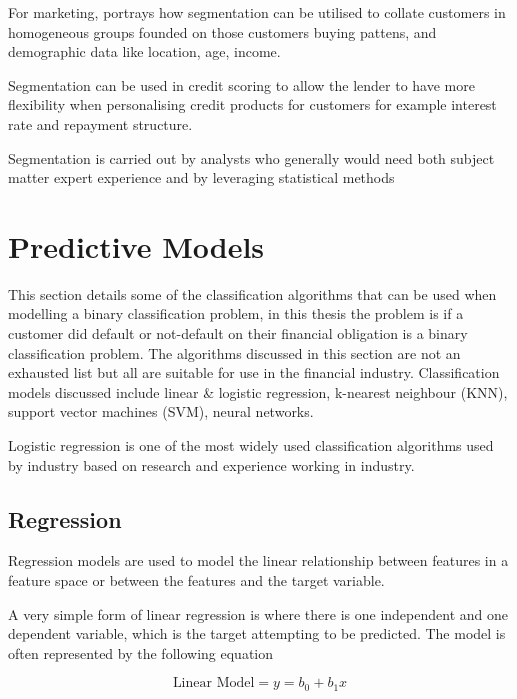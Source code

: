 For marketing, \cite{wedel_market_2012} portrays how segmentation can be utilised to collate customers in homogeneous groups founded on those customers buying pattens, and demographic data like location, age, income.

Segmentation can be used in credit scoring to allow the lender to have more flexibility when personalising credit products for customers for example interest rate and repayment structure\citep{kennedy_credit_2013}.

Segmentation is carried out by analysts who generally would need both subject matter expert experience and by leveraging statistical methods \citep{siddiqi_credit_2012}


\section{Predictive Models}\label{sec:predictModels}
This section details some of the classification algorithms that can be used when modelling a binary classification problem, in this thesis the problem is if a customer did default or not-default on their financial obligation is a binary classification problem. The algorithms discussed in this section are not an exhausted list but all are suitable for use in the financial industry. Classification models discussed include linear \& logistic regression, k-nearest neighbour (KNN), support vector machines (SVM), neural networks. 

Logistic regression is one of the most widely used classification algorithms used by industry based on research and experience working in industry.

\subsection{Regression} \label{Reg}
Regression models are used to model the linear relationship between features in a feature space or between the features and the target variable. 

A very simple form of linear regression is where there is one independent and one dependent variable, which is the target attempting to be predicted. The model is often represented by the following equation

\begin{equation} \label{eq:reg}
	\text{Linear Model} = y = b_0 + b_1x
\end{equation}

